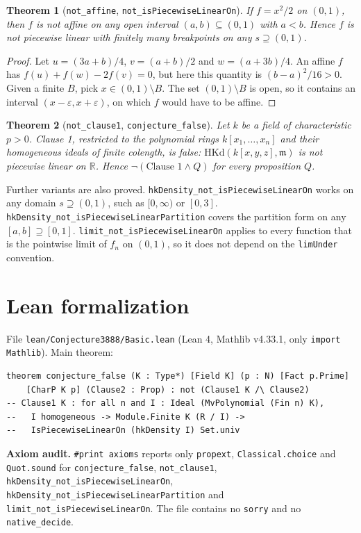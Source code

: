 \documentclass[11pt]{article}
\newtheorem{theorem}{Theorem}
\theoremstyle{definition}
\theoremstyle{remark}
\newcommand{\HKd}{\mathrm{HKd}}
\begin{document}
\begin{theorem}[\texttt{not\_affine}, \texttt{not\_isPiecewiseLinearOn}]
If $f=x^2/2$ on $(0,1)$, then $f$ is not affine on any open interval $(a,b)\subseteq(0,1)$ with $a<b$. Hence $f$ is not
piecewise linear with finitely many breakpoints on any $s\supseteq(0,1)$.
\end{theorem}
\begin{proof}
Let $u=(3a+b)/4$, $v=(a+b)/2$ and $w=(a+3b)/4$. An affine $f$ has $f(u)+f(w)-2f(v)=0$, but here this quantity is
$(b-a)^2/16>0$. Given a finite $B$, pick $x\in(0,1)\setminus B$. The set $(0,1)\setminus B$ is open, so it contains
an interval $(x-\varepsilon,x+\varepsilon)$, on which $f$ would have to be affine.
\end{proof}

\begin{theorem}[\texttt{not\_clause1}, \texttt{conjecture\_false}]
Let $k$ be a field of characteristic $p>0$. Clause 1, restricted to the polynomial rings $k[x_1,\dots,x_n]$ and their
homogeneous ideals of finite colength, is false: $\HKd(k[x,y,z],\mathfrak m)$ is not piecewise linear on $\mathbb{R}$.
Hence $\neg(\text{Clause 1}\wedge Q)$ for every proposition $Q$.
\end{theorem}
Further variants are also proved. \texttt{hkDensity\_not\_isPiecewiseLinearOn} works on any domain $s\supseteq(0,1)$,
such as $[0,\infty)$ or $[0,3]$. \texttt{hkDensity\_not\_isPiecewiseLinearPartition} covers the partition form on any
$[a,b]\supseteq[0,1]$. \texttt{limit\_not\_isPiecewiseLinearOn} applies to every function that is the pointwise limit
of $f_n$ on $(0,1)$, so it does not depend on the \texttt{limUnder} convention.

\section{Lean formalization}
File \texttt{lean/Conjecture3888/Basic.lean} (Lean 4, Mathlib v4.33.1, only \texttt{import Mathlib}). Main theorem:
\begin{verbatim}
theorem conjecture_false (K : Type*) [Field K] (p : N) [Fact p.Prime]
    [CharP K p] (Clause2 : Prop) : not (Clause1 K /\ Clause2)
-- Clause1 K : for all n and I : Ideal (MvPolynomial (Fin n) K),
--   I homogeneous -> Module.Finite K (R / I) ->
--   IsPiecewiseLinearOn (hkDensity I) Set.univ
\end{verbatim}
\textbf{Axiom audit.} \texttt{\#print axioms} reports only \texttt{propext}, \texttt{Classical.choice} and
\texttt{Quot.sound} for \texttt{conjecture\_false}, \texttt{not\_clause1},
\texttt{hkDensity\_not\_isPiecewiseLinearOn}, \texttt{hkDensity\_not\_isPiecewiseLinearPartition} and
\texttt{limit\_not\_isPiecewiseLinearOn}. The file contains no \texttt{sorry} and no \texttt{native\_decide}.
\end{document}
